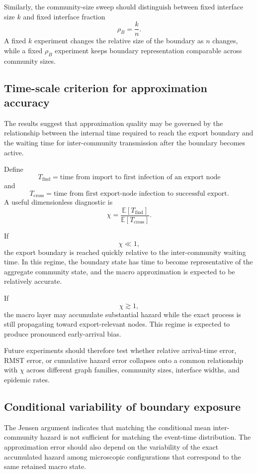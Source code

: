 \documentclass[12pt,a4paper]{article}
\begin{document}
Similarly, the community-size sweep should distinguish between fixed interface size \(k\) and fixed interface fraction
\[
\rho_B
=
\frac{k}{n}.
\]
A fixed \(k\) experiment changes the relative size of the boundary as \(n\) changes, while a fixed \(\rho_B\) experiment keeps boundary representation comparable across community sizes.

\subsection{Time-scale criterion for approximation accuracy}

The results suggest that approximation quality may be governed by the relationship between the internal time required to reach the export boundary and the waiting time for inter-community transmission after the boundary becomes active.

Define
\[
T_{\mathrm{find}}
=
\text{time from import to first infection of an export node}
\]
and
\[
T_{\mathrm{cross}}
=
\text{time from first export-node infection to successful export}.
\]
A useful dimensionless diagnostic is
\[
\chi
=
\frac{\mathbb{E}[T_{\mathrm{find}}]}
     {\mathbb{E}[T_{\mathrm{cross}}]}.
\]

If
\[
\chi\ll1,
\]
the export boundary is reached quickly relative to the inter-community waiting time. In this regime, the boundary state has time to become representative of the aggregate community state, and the macro approximation is expected to be relatively accurate.

If
\[
\chi\gtrsim1,
\]
the macro layer may accumulate substantial hazard while the exact process is still propagating toward export-relevant nodes. This regime is expected to produce pronounced early-arrival bias.

Future experiments should therefore test whether relative arrival-time error, RMST error, or cumulative hazard error collapses onto a common relationship with \(\chi\) across different graph families, community sizes, interface widths, and epidemic rates.

\subsection{Conditional variability of boundary exposure}

The Jensen argument indicates that matching the conditional mean inter-community hazard is not sufficient for matching the event-time distribution. The approximation error should also depend on the variability of the exact accumulated hazard among microscopic configurations that correspond to the same retained macro state.
\end{document}
